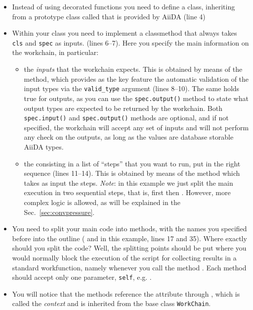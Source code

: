 \begin{itemize}
 \item Instead of using decorated functions you need to define a class, inheriting from a prototype class called  that is provided by AiiDA (line 4)
 \item Within your class you need to implement a  classmethod that always takes \texttt{cls} and \texttt{spec} as inputs. (lines 6--7). Here you specify the main information on the workchain, in particular:
 \begin{itemize}
 \item the \emph{inputs} that the workchain expects. This is obtained by means of the  method, which provides as the key feature the automatic validation of the input types via the \texttt{valid\_type} argument (lines 8--10). The same holds true for outputs, as you can use the \texttt{spec.output()} method to state what output types are expected to be returned by the workchain. Both \texttt{spec.input()} and \texttt{spec.output()} methods are optional, and if not specified, the workchain will accept any set of inputs and will not perform any check on the outputs, as long as the values are database storable AiiDA types.
 \item the  consisting in a list of ``steps'' that you want to run, put in the right sequence (lines 11--14). This is obtained by means of the method  which takes as input the steps. \emph{Note}: in this example we just split the main execution in two sequential steps, that is, first  then . However, more complex logic is allowed, as will be explained in the Sec.~\ref{sec:convpressure}.
 \end{itemize}
 \item You need to split your main code into methods, with the names you specified before into the outline ( and  in this example, lines 17 and 35). Where exactly should you split the code? Well, the splitting points should be put where you would normally block the execution of the script for collecting results in a standard workfunction, namely whenever you call the method . Each method should accept only one parameter, \texttt{self}, e.g. .
 \item You will notice that the methods reference the attribute  through , which is called the \emph{context} and is inherited from the base class \texttt{WorkChain}.

\end{itemize}
